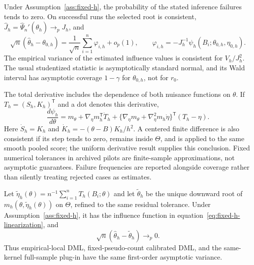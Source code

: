 \begin{theorem}
\label{thm:fixed-h-dml}
Under Assumption~\ref{ass:fixed-h}, the probability of the stated inference
failures tends to zero. On successful runs the selected root is consistent,
$\widehat J_h=\widehat\Psi_n'(\widehat\theta_h)\to_pJ_h$, and
\begin{equation}
\sqrt n(\widehat\theta_h-\theta_{0,h})
=\frac{1}{\sqrt n}\sum_{i=1}^n\varphi_{i,h}+o_p(1),
\qquad
\varphi_{i,h}=-J_h^{-1}
\psi_h(B_i;\theta_{0,h},\eta_{0,h}).
\label{eq:fixed-h-linearization}
\end{equation}
The empirical variance of the estimated influence values is consistent for
$V_h/J_h^2$. The usual studentized statistic is asymptotically standard normal,
and its Wald interval has asymptotic coverage $1-\gamma$ for
$\theta_{0,h}$, not for $r_0$.
\end{theorem}

The total derivative includes the dependence of both nuisance functions on
$\theta$. If $T_h=(S_h,K_h)^{\mathsf T}$ and a dot denotes this derivative,
\begin{equation}
\frac{d\psi_h}{d\theta}
=m_\theta+\nabla_\eta m_h^{\mathsf T}\dot T_h
+\{\nabla_\eta m_\theta+\nabla_\eta^2m_h\dot\eta\}^{\mathsf T}(T_h-\eta).
\label{eq:total-score-derivative}
\end{equation}
Here $\dot S_h=K_h$ and
$\dot K_h=-(\theta-B)K_h/h^2$. A centered finite difference is also consistent
if its step tends to zero, remains inside $\Theta$, and is applied to the same
smooth pooled score; the uniform derivative result supplies this conclusion.
Fixed numerical tolerances in archived pilots are finite-sample
approximations, not asymptotic guarantees. Failure frequencies are reported
alongside coverage rather than silently treating rejected cases as estimates.

\begin{proposition}
\label{prop:plugin-equivalence}
Let $\widetilde\eta_h(\theta)=n^{-1}\sum_{i=1}^nT_h(B_i;\theta)$ and let
$\widetilde\theta_h$ be the unique downward root of
$m_h(\theta,\widetilde\eta_h(\theta))$ on $\Theta$, refined to the same
residual tolerance. Under Assumption~\ref{ass:fixed-h}, it has the influence
function in equation~\eqref{eq:fixed-h-linearization}, and
\begin{equation}
\sqrt n(\widehat\theta_h-\widetilde\theta_h)\to_p0.
\end{equation}
Thus empirical-local DML, fixed-pseudo-count calibrated DML, and the
same-kernel full-sample plug-in have the same first-order asymptotic variance.
\end{proposition}

